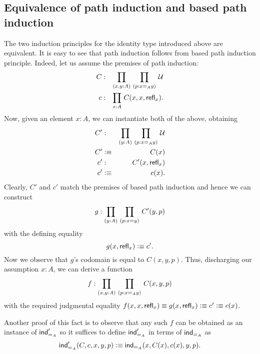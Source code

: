 \subsection{Equivalence of path induction and based path induction}

The two induction principles for the identity type introduced above are equivalent.
It is easy to see that path induction follows from based path induction principle.
Indeed, let us assume the premises of path induction:
\begin{eqnarray*}
C & : & \prd{x,y:A}{p:x =_A y} \UU  \\
c & :  & \prd{x:A} C(x,x,\refl{x}).
\end{eqnarray*}
Now, given an element $x:A$, we can instantiate both of the above, obtaining
\begin{eqnarray*}
C' & : & \prd{y:A}{p:x =_A y} \UU  \\
C' & \defeq & C(x) \\
c' & : & C'(x,\refl{x}) \\
c' & \defeq & c(x).
\end{eqnarray*}
Clearly, $C'$ and $c'$ match the premises of based path induction and hence we can construct 
\begin{eqnarray*}
g : \prd{y:A}{p : x = y} C'(y,p)
\end{eqnarray*}
with the defining equality
\[ g(x,\mathsf{refl}_{x}) \vcentcolon\equiv c' .\]
Now we observe that $g$'s codomain is equal to $C(x,y,p)$.
Thus, discharging our assumption $x:A$, we can derive a function 
\[ f : \prd{x,y:A}{p : x =_A y} C(x,y,p) \]
with the required judgmental equality $f(x,x,\mathsf{refl}_{x}) \equiv g(x,\mathsf{refl}_{x}) \vcentcolon\equiv c' \vcentcolon\equiv c(x)$.

Another proof of this fact is to observe that any such $f$ can be obtained as an instance of $\mathsf{ind}_{=_{A}}'$
so it suffices to define $\mathsf{ind}_{=_{A}}'$ in terms of $\mathsf{ind}_{=_{A}}$ as
\[ \mathsf{ind}_{=_{A}}'(C,c,x,y,p) \vcentcolon\equiv \mathsf{ind}_{=_{A}}(x,C(x),c(x),y,p). \]

